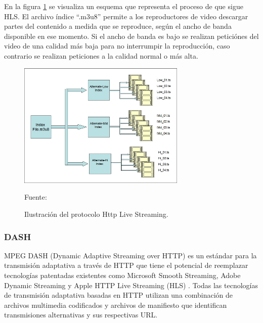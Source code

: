 En la figura \ref{fig:hls} se visualiza un esquema que representa el proceso de que sigue HLS. El archivo índice ``.m3u8'' permite a los reproductores de video descargar partes del contenido a medida que se reproduce, según el ancho de banda disponible en ese momento. Si el ancho de banda es bajo se realizan peticiónes del video de una calidad más baja para no interrumpir la reproducción, caso contrario se realizan peticiones a la calidad normal o más alta.
\begin{figure}[H]
    \begin{center}
        \includegraphics[width=8cm]{img/capitulo_2/hls.jpg}
    \end{center}
    \begin{center}
        \caption{Ilustración del protocolo Http Live Streaming.}
        Fuente: \cite{hls}
        \label{fig:hls}
    \end{center}
\end{figure}

\subsubsection{DASH}

MPEG DASH (Dynamic Adaptive Streaming over HTTP) es un estándar para la transmisión adaptativa a través de HTTP que tiene el potencial de reemplazar tecnologías patentadas existentes como Microsoft Smooth Streaming, Adobe Dynamic Streaming y Apple HTTP Live Streaming (HLS) \cite{dash_streamingmedia}. Todas las tecnologías de transmisión adaptativa basadas en HTTP utilizan una combinación de archivos multimedia codificados y archivos de manifiesto que identifican transmisiones alternativas y sus respectivas URL.\\

